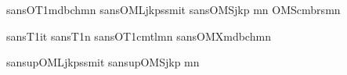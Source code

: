 






\makeatletter
\newif\ifkp@upRm
\newif\ifkp@osm
\newif\ifkp@vosm
\makeatother


   {sans}{OT1}{mdbch}{m}{n}
     {sans}{OML}{jkpss}{m}{it}
     {sans}{OMS}{jkp}  {m}{n}
  {OMS}{cmbrs}{m}{n}

\SetMathAlphabet{\mathit} {sans}{T1}{\savesffamily}{\savesfmdseries}{it}
\SetMathAlphabet{\mathbf} {sans}{T1}{\savesffamily}{\savesfbfseries}{n}
\SetMathAlphabet{\mathtt} {sans}{OT1}{cmtl}{m}{n}
 {sans}{OMX}{mdbch}{m}{n}

  {sansup}{OML}{jkpss}{m}{it}
  {sansup}{OMS}{jkp}  {m}{n}

